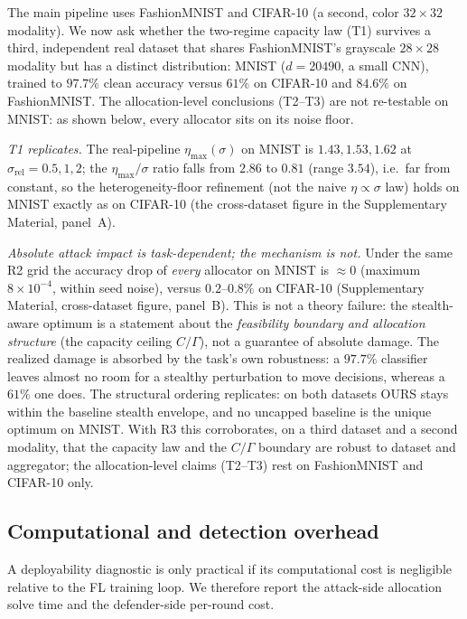 \documentclass[final,1p,times]{elsarticle}
\begin{document}
The main pipeline uses FashionMNIST and CIFAR-10 (a second, color
$32{\times}32$ modality). We now ask whether the two-regime capacity law
(T1) survives a third,
independent real dataset that shares FashionMNIST's grayscale
$28{\times}28$ modality but has a distinct distribution: MNIST
($d{=}20490$, a small CNN), trained to $97.7\%$ clean accuracy versus
$61\%$ on CIFAR-10 and $84.6\%$ on FashionMNIST. The allocation-level
conclusions (T2--T3) are not re-testable on MNIST: as shown below, every
allocator sits on its noise floor.

\emph{T1 replicates.} The real-pipeline $\eta_{\max}(\sigma)$ on MNIST is
$1.43,1.53,1.62$ at $\sigma_{\mathrm{rel}}{=}0.5,1,2$; the
$\eta_{\max}/\sigma$ ratio falls from $2.86$ to $0.81$ (range $3.54$),
i.e.\ far from constant, so the heterogeneity-floor refinement (not
the naive $\eta\propto\sigma$ law) holds on MNIST exactly as on CIFAR-10
(the cross-dataset figure in the Supplementary Material, panel~A).

\emph{Absolute attack impact is task-dependent; the mechanism is not.}
Under the same R2 grid the accuracy drop of \emph{every} allocator on
MNIST is $\approx 0$ (maximum $8{\times}10^{-4}$, within seed noise),
versus $0.2$--$0.8\%$ on CIFAR-10 (Supplementary Material,
cross-dataset figure, panel~B). This is not a
theory failure: the stealth-aware optimum is a statement about the
\emph{feasibility boundary and allocation structure} (the capacity ceiling
$C/\Gamma$), not a guarantee of absolute damage. The realized damage is
absorbed by the task's own robustness: a $97.7\%$ classifier leaves
almost no room for a stealthy perturbation to move decisions, whereas a
$61\%$ one does. The structural ordering replicates: on both datasets
OURS stays within the baseline stealth envelope, and no uncapped baseline
is the unique optimum on MNIST. With R3 this corroborates, on a third
dataset and a second modality, that the capacity law and the $C/\Gamma$
boundary are robust to dataset and aggregator; the allocation-level
claims (T2--T3) rest on FashionMNIST and CIFAR-10 only.

\subsection{Computational and detection overhead}
A deployability diagnostic is only practical if its computational cost is
negligible relative to the FL training loop. We therefore report the
attack-side allocation solve time and the defender-side per-round cost.
\end{document}
